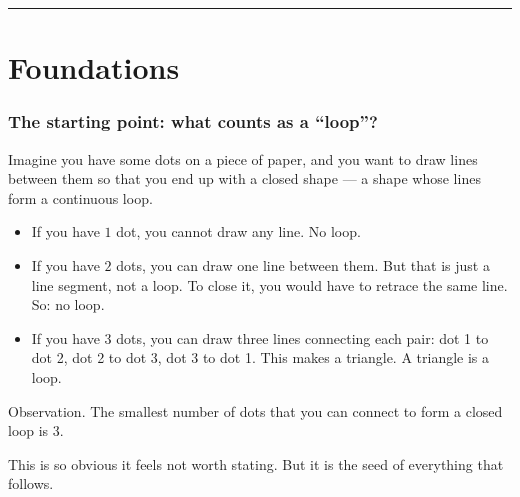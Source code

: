 \documentclass[11pt]{article}
\def\textbf#1{#1}%
\begin{document}
\vspace{1em}
\noindent\rule{0.98\linewidth}{0.4pt}
\vspace{1em}

\tableofcontents

\vspace{2em}

\part{Foundations}

\section{The starting point: what counts as a ``loop''?}

Imagine you have some dots on a piece of paper, and you want to draw lines between them so that you end up with a closed shape --- a shape whose lines form a continuous loop.

\begin{itemize}[leftmargin=2em]
\item If you have $1$ dot, you cannot draw any line. No loop.
\item If you have $2$ dots, you can draw one line between them. But that is just a line segment, not a loop. To close it, you would have to retrace the same line. So: no loop.
\item If you have $3$ dots, you can draw three lines connecting each pair: dot 1 to dot 2, dot 2 to dot 3, dot 3 to dot 1. This makes a triangle. \textbf{A triangle is a loop.}
\end{itemize}

\begin{center}
\end{center}

\textbf{Observation.} The smallest number of dots that you can connect to form a closed loop is $3$.

This is so obvious it feels not worth stating. But it is the seed of everything that follows.
\end{document}
